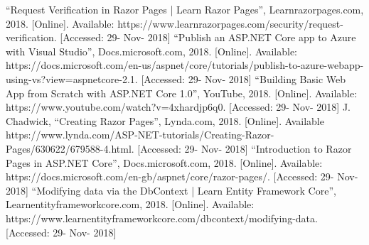 \documentclass{article}
\begin{document}
\newpage
\begin{thebibliography}{1}
        ``Request Verification in Razor Pages | Learn Razor Pages'', Learnrazorpages.com, 2018. [Online]. Available: https://www.learnrazorpages.com/security/request-verification. [Accessed: 29- Nov- 2018]
        ``Publish an ASP.NET Core app to Azure with Visual Studio'', Docs.microsoft.com, 2018. [Online]. Available: https://docs.microsoft.com/en-us/aspnet/core/tutorials/publish-to-azure-webapp-using-vs?view=aspnetcore-2.1. [Accessed: 29- Nov- 2018]
        ``Building Basic Web App from Scratch with ASP.NET Core 1.0'', YouTube, 2018. [Online]. Available: https://www.youtube.com/watch?v=4xhardjp6q0. [Accessed: 29- Nov- 2018]
        J. Chadwick, ``Creating Razor Pages'', Lynda.com, 2018. [Online]. Available https://www.lynda.com/ASP-NET-tutorials/Creating-Razor-Pages/630622/679588-4.html. [Accessed: 29- Nov- 2018]
        ``Introduction to Razor Pages in ASP.NET Core'', Docs.microsoft.com, 2018. [Online]. Available: https://docs.microsoft.com/en-gb/aspnet/core/razor-pages/. [Accessed: 29- Nov- 2018]
        ``Modifying data via the DbContext | Learn Entity Framework Core'', Learnentityframeworkcore.com, 2018. [Online]. Available: https://www.learnentityframeworkcore.com/dbcontext/modifying-data. [Accessed: 29- Nov- 2018]
\end{thebibliography}
\end{document}
